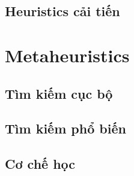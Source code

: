 \subsection{Heuristics cải tiến}

\section{Metaheuristics}
\subsection{Tìm kiếm cục bộ}
\subsection{Tìm kiếm phổ biến}
\subsection{Cơ chế học}



